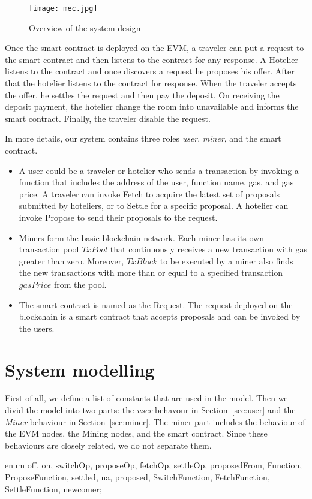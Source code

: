 \documentclass{KERauth}
\begin{document}
\begin{figure}[t]
\texttt{[image: mec.jpg]}
\caption{Overview of the system design}
\label{fig:overview}
\end{figure}

Once the smart contract is deployed on the EVM, a traveler can put a request to the smart contract and then listens to the contract for any response. A Hotelier listens to the contract and once discovers a request he proposes his offer. After that the hotelier listens to the contract for response. When the traveler accepts the offer, he settles the request and then pay the deposit. On receiving the deposit payment, the hotelier change the room into unavailable and informs the smart contract. Finally, the traveler disable the request.

In more details, our system contains three roles \emph{user}, \emph{miner}, and the {smart contract}.
\begin{itemize}
    \item A user could be a traveler or hotelier who sends a transaction by invoking a function that includes
the address of the user, function name, gas, and gas price. A traveler can invoke Fetch to acquire the latest
set of proposals submitted by hoteliers, or to Settle for a specific proposal.
A hotelier can invoke Propose
to send their proposals to the request.
\item Miners form the basic blockchain network. Each miner has its own transaction pool $TxPool$ that continuously receives a new transaction with
gas greater than zero. Moreover, $TxBlock$ to be executed by a miner also finds the new transactions with
more than or equal to a specified transaction $gasPrice$ from the pool.
\item The smart contract is named as the Request. The request deployed on the blockchain is a smart contract that accepts proposals
and can be invoked by the users.
\end{itemize}


\section{System modelling}

First of all, we define a list of constants that are used in the model. Then we divid the model into two parts: the \emph{user} behavour in Section~\ref{sec:user} and the \emph{Miner} behaviour in Section~\ref{sec:miner}. The miner part includes the behaviour of the EVM nodes, the Mining nodes, and the smart contract. Since these behaviours are closely related, we do not separate them.
\begin{center}
\begin{boxedverbatim}
enum {off, on, switchOp, proposeOp, fetchOp, settleOp, proposedFrom,
      Function, ProposeFunction, settled, na, proposed, SwitchFunction,
      FetchFunction, SettleFunction, newcomer};
\end{boxedverbatim}
\end{center}
\end{document}
